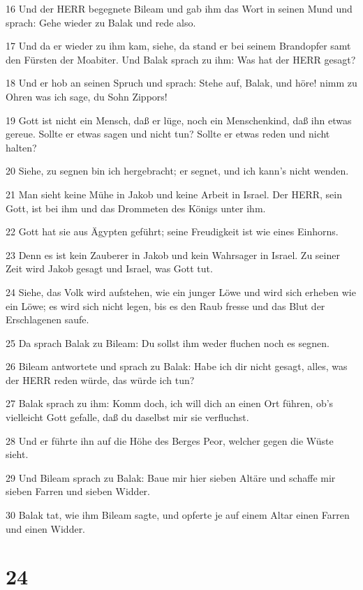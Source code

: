 \par 16 Und der HERR begegnete Bileam und gab ihm das Wort in seinen Mund und sprach: Gehe wieder zu Balak und rede also.
\par 17 Und da er wieder zu ihm kam, siehe, da stand er bei seinem Brandopfer samt den Fürsten der Moabiter. Und Balak sprach zu ihm: Was hat der HERR gesagt?
\par 18 Und er hob an seinen Spruch und sprach: Stehe auf, Balak, und höre! nimm zu Ohren was ich sage, du Sohn Zippors!
\par 19 Gott ist nicht ein Mensch, daß er lüge, noch ein Menschenkind, daß ihn etwas gereue. Sollte er etwas sagen und nicht tun? Sollte er etwas reden und nicht halten?
\par 20 Siehe, zu segnen bin ich hergebracht; er segnet, und ich kann's nicht wenden.
\par 21 Man sieht keine Mühe in Jakob und keine Arbeit in Israel. Der HERR, sein Gott, ist bei ihm und das Drommeten des Königs unter ihm.
\par 22 Gott hat sie aus Ägypten geführt; seine Freudigkeit ist wie eines Einhorns.
\par 23 Denn es ist kein Zauberer in Jakob und kein Wahrsager in Israel. Zu seiner Zeit wird Jakob gesagt und Israel, was Gott tut.
\par 24 Siehe, das Volk wird aufstehen, wie ein junger Löwe und wird sich erheben wie ein Löwe; es wird sich nicht legen, bis es den Raub fresse und das Blut der Erschlagenen saufe.
\par 25 Da sprach Balak zu Bileam: Du sollst ihm weder fluchen noch es segnen.
\par 26 Bileam antwortete und sprach zu Balak: Habe ich dir nicht gesagt, alles, was der HERR reden würde, das würde ich tun?
\par 27 Balak sprach zu ihm: Komm doch, ich will dich an einen Ort führen, ob's vielleicht Gott gefalle, daß du daselbst mir sie verfluchst.
\par 28 Und er führte ihn auf die Höhe des Berges Peor, welcher gegen die Wüste sieht.
\par 29 Und Bileam sprach zu Balak: Baue mir hier sieben Altäre und schaffe mir sieben Farren und sieben Widder.
\par 30 Balak tat, wie ihm Bileam sagte, und opferte je auf einem Altar einen Farren und einen Widder.

\chapter{24}

